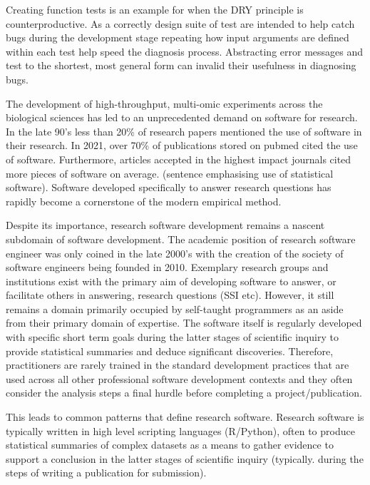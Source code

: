 \documentclass[../main.tex]{subfiles}
\begin{document}
Creating function tests is an example for when the DRY principle is counterproductive.
As a correctly design suite of test are intended to help catch bugs during the development stage repeating how input arguments are defined within each test help speed the diagnosis process.
Abstracting error messages and test to the shortest, most general form can invalid their usefulness in diagnosing bugs.



The development of high-throughput, multi-omic experiments across the biological sciences has led to an unprecedented demand on software for research. In the late 90's less than 20\% of research papers mentioned the use of software in their research. In 2021, over 70\% of publications stored on pubmed cited the use of software. Furthermore, articles accepted in the highest impact journals cited more pieces of software on average. (sentence emphasising use of statistical software). Software developed specifically to answer research questions has rapidly become a cornerstone of the modern empirical method. \cite{Schindler2022}

Despite its importance, research software development remains a nascent subdomain of software development. The academic position of research software engineer was only coined in the late 2000's \cite{Prause2010} with the creation of the society of software engineers being founded in 2010. Exemplary research groups and institutions exist with the primary aim of developing software to answer, or facilitate others in answering, research questions (SSI etc). However, it still remains a domain primarily occupied by self-taught programmers as an aside from their primary domain of expertise.  The software itself is regularly developed with specific short term goals during the latter stages of scientific inquiry to provide statistical summaries and deduce significant discoveries. Therefore, practitioners are rarely trained in the standard development practices that are used across all other professional software development contexts and they often consider the analysis steps a final hurdle before completing a project/publication.

This leads to common patterns that define research software. Research software is typically written in high level scripting languages (R/Python), often to produce statistical summaries of complex datasets as a means to gather evidence to support a conclusion in the latter stages of scientific inquiry (typically. during the steps of writing a publication for submission).
\end{document}
